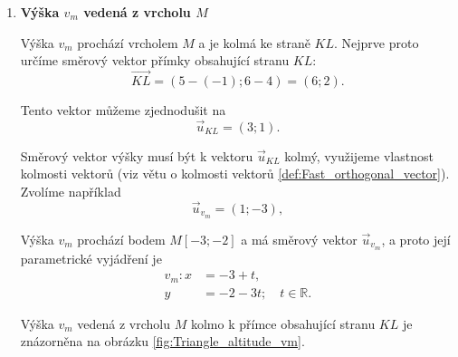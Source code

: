 \begin{example}
\begin{enumerate}[label=\alph*), leftmargin=2em]
\begin{figure}[H]
            \caption{Přímka $p_{LM}$, na níž leží strana $LM$ trojúhelníku $KLM$.}
            \label{fig:Triangle_line_LM}
        \end{figure}

        \item \textbf{Výška $v_m$ vedená z vrcholu $M$}

        Výška $v_m$ prochází vrcholem $M$ a je kolmá ke straně $KL$.
        Nejprve proto určíme směrový vektor přímky obsahující stranu
        $KL$:
        \[
            \overrightarrow{KL}
            =
            (5-(-1);6-4)
            =
            (6;2).
        \]

        Tento vektor můžeme zjednodušit na
        \[
            \vec{u}_{KL}=(3;1).
        \]

        Směrový vektor výšky musí být k vektoru $\vec{u}_{KL}$ kolmý, využijeme vlastnost kolmosti vektorů (viz větu o kolmosti vektorů \ref{def:Fast_orthogonal_vector}).
        Zvolíme například
        \[
            \vec{u}_{v_m}=(1;-3),
        \]

        Výška $v_m$ prochází bodem $M[-3;-2]$ a má směrový vektor $\vec{u}_{v_m}$, a proto její parametrické
        vyjádření je
        \begin{align*}
            v_m: x &= -3+t,\\
                 y &= -2-3t;
                 \quad t\in\mathbb{R}.
        \end{align*}

        Výška $v_m$ vedená z vrcholu $M$ kolmo k přímce obsahující stranu $KL$ je znázorněna na obrázku \ref{fig:Triangle_altitude_vm}.

        \begin{figure}[H]
            \centering
\end{figure}
\end{enumerate}
\end{example}
